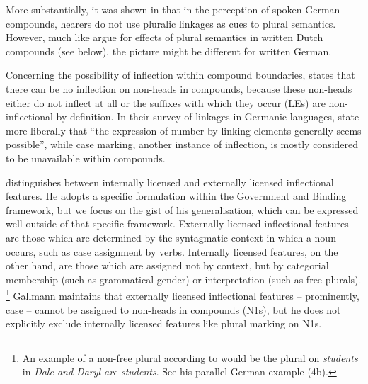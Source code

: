 More substantially, it was shown in \textcite{KoesterEa2004} that in the perception of spoken German compounds, hearers do not use pluralic linkages as cues to plural semantics.
However, much like \textcite{SchreuderEa1998} argue for effects of plural semantics in written Dutch compounds (see below), the picture might be different for written German.

Concerning the possibility of inflection within compound boundaries, \textcite[9]{Schluecker2012} states that there can be no inflection on non-heads in compounds, because these non-heads either do not inflect at all or the suffixes with which they occur (\ie LEs) are non-inflectional by definition.
In their survey of linkages in Germanic languages, \textcite[577]{FuhrhopKuerschner2015} state more liberally that ``the expression of number by linking elements generally seems possible'', while case marking, another instance of inflection, is mostly considered to be unavailable within compounds.

\textcite[178--180]{Gallmann1998} distinguishes between internally licensed and externally licensed inflectional features.
He adopts a specific formulation within the Government and Binding framework, but we focus on the gist of his generalisation, which can be expressed well outside of that specific framework.
Externally licensed inflectional features are those which are determined by the syntagmatic context in which a noun occurs, such as case assignment by verbs.
Internally licensed features, on the other hand, are those which are assigned not by context, but by categorial membership (such as grammatical gender) or interpretation (such as free plurals).%
\footnote{An example of a non-free plural according to \textcite[179]{Gallmann1998} would be the plural on \textit{students} in \textit{Dale and Daryl are students}.
See his parallel German example (4b).
}
Gallmann maintains that externally licensed inflectional features -- prominently, case -- cannot be assigned to non-heads in compounds (N1s), but he does not explicitly exclude internally licensed features like plural marking on N1s.

